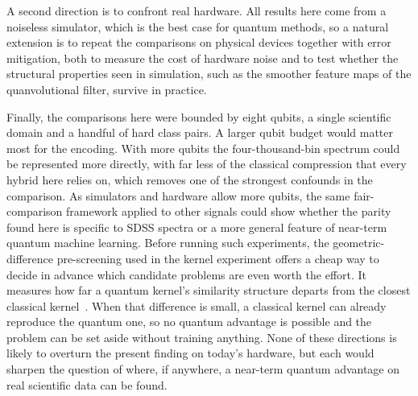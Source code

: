 A second direction is to confront real hardware. All results here come from a noiseless
simulator, which is the best case for quantum methods, so a natural extension is to
repeat the comparisons on physical devices together with error mitigation, both to
measure the cost of hardware noise and to test whether the structural properties seen in
simulation, such as the smoother feature maps of the quanvolutional filter, survive in
practice.

Finally, the comparisons here were bounded by eight qubits, a single scientific domain
and a handful of hard class pairs. A larger qubit budget would matter most for the
encoding. With more qubits the four-thousand-bin spectrum could be represented more
directly, with far less of the classical compression that every hybrid here relies on,
which removes one of the strongest confounds in the comparison. As simulators and
hardware allow more qubits, the same fair-comparison framework applied to other signals
could show whether the parity found here is specific to SDSS spectra or a more general
feature of near-term quantum machine learning. Before running such experiments, the
geometric-difference pre-screening used in the kernel experiment offers a cheap way to
decide in advance which candidate problems are even worth the effort. It measures how far
a quantum kernel's similarity structure departs from the closest classical
kernel~\cite{huang2021power}. When that difference is small, a classical kernel can
already reproduce the quantum one, so no quantum advantage is possible and the problem can
be set aside without training anything.
None of these directions is likely to overturn the present finding on today's hardware,
but each would sharpen the question of where, if anywhere, a near-term quantum advantage
on real scientific data can be found.

